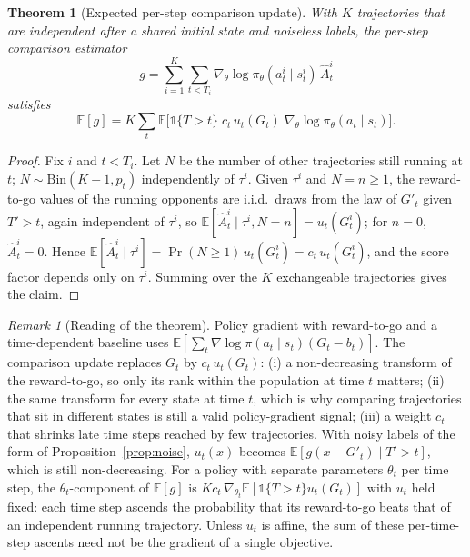 \documentclass[11pt]{article}
\newtheorem{theorem}{Theorem}
\theoremstyle{remark}
\newtheorem{remark}{Remark}
\newcommand{\E}{\mathbb{E}}
\begin{document}
\begin{theorem}[Expected per-step comparison update]
\label{thm:multistep}
With $K$ trajectories that are independent after a shared initial state and noiseless labels, the per-step comparison estimator
\[
g=\sum_{i=1}^{K}\sum_{t<T_i}\nabla_\theta\log\pi_\theta(a^i_t\mid s^i_t)\,\hat A^i_t
\]
satisfies
\[
\E[g]=K\sum_{t}\E\Big[\mathbb{1}\{T>t\}\;c_t\,u_t(G_t)\;\nabla_\theta\log\pi_\theta(a_t\mid s_t)\Big].
\]
\end{theorem}
\begin{proof}
Fix $i$ and $t<T_i$. Let $N$ be the number of other trajectories still running at $t$; $N\sim\mathrm{Bin}(K-1,p_t)$ independently of $\tau^i$. Given $\tau^i$ and $N=n\ge1$, the reward-to-go values of the running opponents are i.i.d.\ draws from the law of $G'_t$ given $T'>t$, again independent of $\tau^i$, so $\E[\hat A^i_t\mid\tau^i,N=n]=u_t(G^i_t)$; for $n=0$, $\hat A^i_t=0$. Hence $\E[\hat A^i_t\mid\tau^i]=\Pr(N\ge1)\,u_t(G^i_t)=c_t\,u_t(G^i_t)$, and the score factor depends only on $\tau^i$. Summing over the $K$ exchangeable trajectories gives the claim.
\end{proof}

\begin{remark}[Reading of the theorem]
Policy gradient with reward-to-go and a time-dependent baseline uses $\E[\sum_t\nabla\log\pi(a_t\mid s_t)(G_t-b_t)]$. The comparison update replaces $G_t$ by $c_t\,u_t(G_t)$: (i) a non-decreasing transform of the reward-to-go, so only its rank within the population at time $t$ matters; (ii) the same transform for every state at time $t$, which is why comparing trajectories that sit in different states is still a valid policy-gradient signal; (iii) a weight $c_t$ that shrinks late time steps reached by few trajectories. With noisy labels of the form of Proposition~\ref{prop:noise}, $u_t(x)$ becomes $\E[g(x-G'_t)\mid T'>t]$, which is still non-decreasing. For a policy with separate parameters $\theta_t$ per time step, the $\theta_t$-component of $\E[g]$ is $K c_t\,\nabla_{\theta_t}\E[\mathbb{1}\{T>t\}u_t(G_t)]$ with $u_t$ held fixed: each time step ascends the probability that its reward-to-go beats that of an independent running trajectory. Unless $u_t$ is affine, the sum of these per-time-step ascents need not be the gradient of a single objective.
\end{remark}
\end{document}
